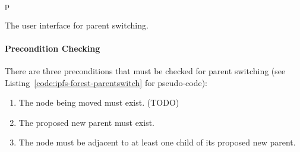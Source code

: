 \begin{stusubfig}{p}
	\hspace{8mm}%
	\\
	\hspace{8mm}%
\caption{The user interface for parent switching.}
\label{fig:ipfs-forest-parentswitch-gui}
\end{stusubfig}

\paragraph{Precondition Checking}

There are three preconditions that must be checked for parent switching (see Listing~\ref{code:ipfs-forest-parentswitch} for pseudo-code):

\begin{enumerate}

\item The node being moved must exist. (TODO)
\item The proposed new parent must exist.
\item The node must be adjacent to at least one child of its proposed new parent.

\end{enumerate}

